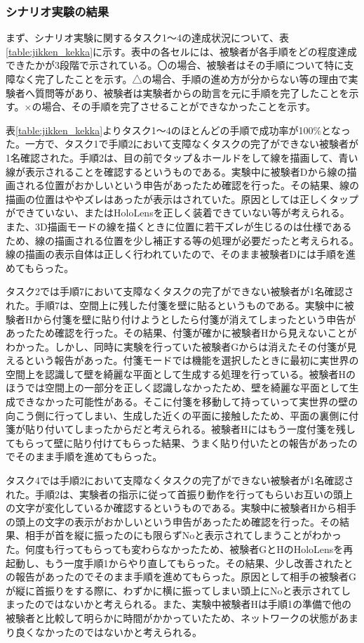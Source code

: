 \documentclass[11pt,a4j, titlepage]{jarticle} %
\begin{document}
\subsubsection{シナリオ実験の結果}
まず、シナリオ実験に関するタスク1～4の達成状況について、表\ref{table:jikken_kekka}に示す。表中の各セルには、被験者が各手順をどの程度達成できたかが3段階で示されている。〇の場合、被験者はその手順について特に支障なく完了したことを示す。△の場合、手順の進め方が分からない等の理由で実験者へ質問等があり、被験者は実験者からの助言を元に手順を完了したことを示す。×の場合、その手順を完了させることができなかったことを示す。

表\ref{table:jikken_kekka}よりタスク1～4のほとんどの手順で成功率が100\%となった。一方で、タスク1で手順2において支障なくタスクの完了ができない被験者が1名確認された。手順2は、目の前でタップ＆ホールドをして線を描画して、青い線が表示されることを確認するというものである。実験中に被験者Dから線の描画される位置がおかしいという申告があったため確認を行った。その結果、線の描画の位置はややズレはあったが表示はされていた。原因としては正しくタップができていない、またはHoloLensを正しく装着できていない等が考えられる。また、3D描画モードの線を描くときに位置に若干ズレが生じるのは仕様であるため、線の描画される位置を少し補正する等の処理が必要だったと考えられる。線の描画の表示自体は正しく行われていたので、そのまま被験者Dには手順を進めてもらった。

タスク2では手順7において支障なくタスクの完了ができない被験者が1名確認された。手順7は、空間上に残した付箋を壁に貼るというものである。実験中に被験者Hから付箋を壁に貼り付けようとしたら付箋が消えてしまったという申告があったため確認を行った。その結果、付箋が確かに被験者Hから見えないことがわかった。しかし、同時に実験を行っていた被験者Gからは消えたその付箋が見えるという報告があった。付箋モードでは機能を選択したときに最初に実世界の空間上を認識して壁を綺麗な平面として生成する処理を行っている。被験者Hのほうでは空間上の一部分を正しく認識しなかったため、壁を綺麗な平面として生成できなかった可能性がある。そこに付箋を移動して持っていって実世界の壁の向こう側に行ってしまい、生成した近くの平面に接触したため、平面の裏側に付箋が貼り付いてしまったからだと考えられる。被験者Hにはもう一度付箋を残してもらって壁に貼り付けてもらった結果、うまく貼り付いたとの報告があったのでそのまま手順を進めてもらった。

タスク4では手順2において支障なくタスクの完了ができない被験者が1名確認された。手順2は、実験者の指示に従って首振り動作を行ってもらいお互いの頭上の文字が変化しているか確認するというものである。実験中に被験者Hから相手の頭上の文字の表示がおかしいという申告があったため確認を行った。その結果、相手が首を縦に振ったのにも限らずNoと表示されてしまうことがわかった。何度も行ってもらっても変わらなかったため、被験者GとHのHoloLensを再起動し、もう一度手順1からやり直してもらった。その結果、少し改善されたとの報告があったのでそのまま手順を進めてもらった。原因として相手の被験者Gが縦に首振りをする際に、わずかに横に振ってしまい頭上にNoと表示されてしまったのではないかと考えられる。また、実験中被験者Hは手順1の準備で他の被験者と比較して明らかに時間がかかっていたため、ネットワークの状態があまり良くなかったのではないかと考えられる。
\end{document}
